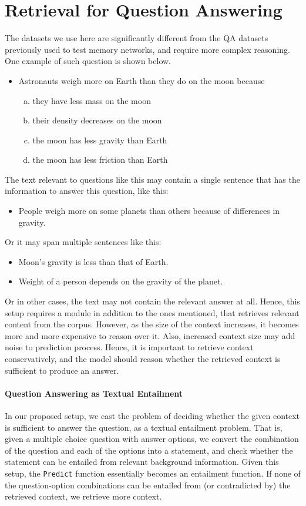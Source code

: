 \section{Retrieval for Question Answering}
The datasets we use here are significantly different from the
QA datasets previously used to test memory networks, and require more complex
reasoning. One example of such question is shown below.
\begin{itemize}
\item Astronauts weigh more on Earth than they do on the moon because
\begin{enumerate}[(a)]
 \item they have less mass on the moon
 \item their density decreases on the moon
 \item the moon has less gravity than Earth
 \item the moon has less friction than Earth
\end{enumerate}
\end{itemize}
The text relevant to questions like this may contain a single sentence that
has the information to answer this question, like this:
\begin{itemize}
 \item People weigh more on some planets than others because of differences in gravity.
\end{itemize}

Or it may span multiple sentences like this:
\begin{itemize}
 \item Moon's gravity is less than that of Earth.
 \item Weight of a person depends on the gravity of the planet.
\end{itemize}

Or in other cases, the text may not contain the relevant answer at all. Hence, this setup
requires a module in addition to the ones mentioned, that retrieves relevant content from
the corpus. However, as the size of the context increases, it becomes more and more expensive to reason over
it. Also, increased context size may add noise to prediction process. Hence, it is important to
retrieve context conservatively, and the model should reason whether the retrieved context
is sufficient to produce an answer.

\paragraph{Question Answering as Textual Entailment} In our proposed setup, we
cast the problem of deciding whether the given context is sufficient to answer the question, as a
textual entailment problem. That is, given a multiple choice question with answer options, we
convert the combination of the question and each of the options into a
statement, and check whether the statement can be entailed from relevant
background information. Given this setup, the \texttt{Predict} function
essentially becomes an entailment function. If none of the question-option combinations
can be entailed from (or contradicted by) the retrieved context, we retrieve more context.

